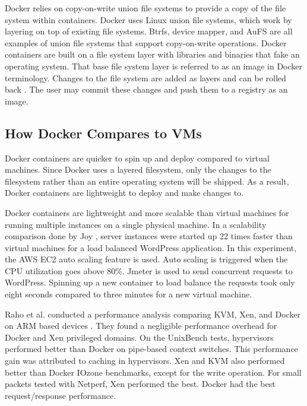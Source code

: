 \documentclass[11pt]{article}
\begin{document}
Docker relies on copy-on-write union file systems to provide a copy of the file system within containers. Docker uses Linux union file systems, which work by layering on top of existing file systems. Btrfs, device mapper, and AuFS are all examples of union file systems that support copy-on-write operations. Docker containers are built on a file system layer with libraries and binaries that fake an operating system. That base file system layer is referred to as an image in Docker terminology. Changes to the file system are added as layers and can be rolled back \cite{anderson}. The user may commit these changes and push them to a registry as an image.


\subsection{How Docker Compares to VMs}
Docker containers are quicker to spin up and deploy compared to virtual machines. Since Docker uses a layered filesystem, only the changes to the filesystem rather than an entire operating system will be shipped. As a result, Docker containers are lightweight to deploy and make changes to.

Docker containers are lightweight and more scalable than virtual machines for running multiple instances on a single physical machine. In a scalability comparison done by Joy \cite{joy}, server instances were started up 22 times faster than virtual machines for a load balanced WordPress application. In this experiment, the AWS EC2 auto scaling feature is used. Auto scaling is triggered when the CPU utilization goes above 80\%. Jmeter is used to send concurrent requests to WordPress. Spinning up a new container to load balance the requests took only eight seconds compared to three minutes for a new virtual machine.

Raho et al. conducted a performance analysis comparing KVM, Xen, and Docker on ARM based devices \cite{raho}. They found a negligible performance overhead for Docker and Xen privileged domains. On the UnixBench tests, hypervisors performed better than Docker on pipe-based context switches. This performance gain was attributed to caching in hypervisors. Xen and KVM also performed better than Docker IOzone benchmarks, except for the write operation. For small packets tested with Netperf, Xen performed the best. Docker had the best request/response performance.
\end{document}
